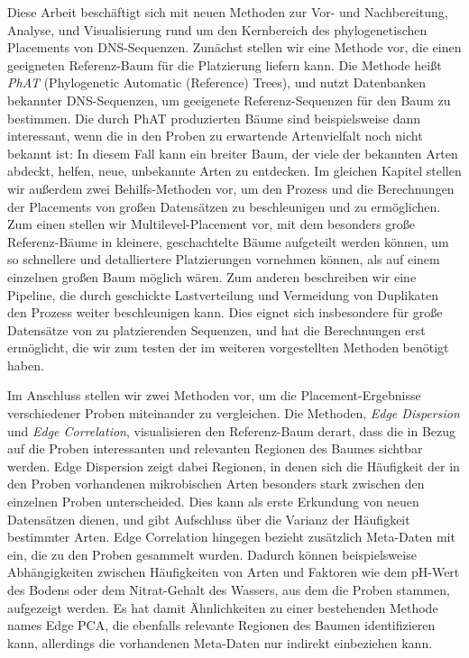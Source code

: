 Diese Arbeit besch\"aftigt sich mit neuen Methoden zur Vor- und Nachbereitung, Analyse, und Visualisierung
rund um den Kernbereich des phylogenetischen Placements von DNS-Sequenzen.
Zun\"achst stellen wir eine Methode vor, die einen geeigneten Referenz-Baum f\"ur die Platzierung liefern kann.
Die Methode hei\ss{}t \emph{PhAT} (Phylogenetic Automatic (Reference) Trees),
und nutzt Datenbanken bekannter DNS-Sequenzen, um geeigenete Referenz-Sequenzen f\"ur den Baum zu bestimmen.
Die durch PhAT produzierten B\"aume sind beispielsweise dann interessant,
wenn die in den Proben zu erwartende Artenvielfalt noch nicht bekannt ist:
In diesem Fall kann ein breiter Baum, der viele der bekannten Arten abdeckt, helfen, neue, unbekannte Arten zu entdecken.
Im gleichen Kapitel stellen wir au\ss{}erdem zwei Behilfs-Methoden vor,
um den Prozess und die Berechnungen der Placements von gro\ss{}en Datens\"atzen zu beschleunigen und zu erm\"oglichen.
Zum einen stellen wir Multilevel-Placement vor,
mit dem besonders gro\ss{}e Referenz-B\"aume in kleinere, geschachtelte B\"aume aufgeteilt werden k\"onnen,
um so schnellere und detalliertere Platzierungen vornehmen k\"onnen, als auf einem einzelnen gro\ss{}en Baum m\"oglich w\"aren.
Zum anderen beschreiben wir eine Pipeline, die durch geschickte Lastverteilung und Vermeidung von Duplikaten
den Prozess weiter beschleunigen kann.
Dies eignet sich insbesondere f\"ur gro\ss{}e Datens\"atze von zu platzierenden Sequenzen,
und hat die Berechnungen erst erm\"oglicht, die wir zum testen der im weiteren vorgestellten Methoden ben\"otigt haben.

Im Anschluss stellen wir zwei Methoden vor, um die Placement-Ergebnisse verschiedener Proben miteinander zu vergleichen.
Die Methoden, \emph{Edge Dispersion} und \emph{Edge Correlation}, visualisieren den Referenz-Baum derart,
dass die in Bezug auf die Proben interessanten und relevanten Regionen des Baumes sichtbar werden.
Edge Dispersion zeigt dabei Regionen, in denen sich die H\"aufigkeit der in den Proben vorhandenen mikrobischen Arten
besonders stark zwischen den einzelnen Proben unterscheided.
Dies kann als erste Erkundung von neuen Datens\"atzen dienen,
und gibt Aufschluss \"uber die Varianz der H\"aufigkeit bestimmter Arten.
Edge Correlation hingegen bezieht zus\"atzlich Meta-Daten mit ein, die zu den Proben gesammelt wurden.
Dadurch k\"onnen beispielsweise Abh\"angigkeiten zwischen H\"aufigkeiten von Arten und Faktoren wie dem pH-Wert des Bodens
oder dem Nitrat-Gehalt des Wassers, aus dem die Proben stammen, aufgezeigt werden.
Es hat damit \"Ahnlichkeiten zu einer bestehenden Methode names Edge PCA,
die ebenfalls relevante Regionen des Baumen identifizieren kann,
allerdings die vorhandenen Meta-Daten nur indirekt einbeziehen kann.

